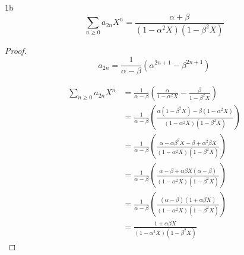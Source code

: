 \documentclass{article}
\begin{document}
\begin{claim}{1b}\label{Claim 1b.}
    \[
        \sum_{n \geq 0}a_{2n} X^n = \frac{\alpha + \beta}{(1 - \alpha^2 X)(1 - \beta^2 X)}
    \]
\end{claim}
\begin{proof}
    \[a_{2n} = \frac{1}{\alpha - \beta}(\alpha^{2n + 1} - \beta^{2n + 1})\]

    \begin{align*}
        \sum_{n \geq 0} a_{2n} X^n &= \frac{1}{\alpha - \beta}\left(\frac{\alpha}{1 - \alpha^2X} - \frac{\beta}{1 - \beta^2X}\right) \\
        &= \frac{1}{\alpha - \beta}\left(\frac{\alpha(1 - \beta^2X) - \beta(1 - \alpha^2 X)}{(1 - \alpha^2X)(1 - \beta^2X)}\right) \\
        &= \frac{1}{\alpha - \beta}\left(\frac{\alpha - \alpha\beta^2X - \beta + \alpha^2 \beta X}{(1 - \alpha^2X)(1 - \beta^2X)}\right) \\
        &= \frac{1}{\alpha - \beta}\left(\frac{\alpha - \beta + \alpha\beta X(\alpha - \beta)}{(1 - \alpha^2X)(1 - \beta^2X)}\right) \\
        &= \frac{1}{\alpha - \beta}\left(\frac{(\alpha - \beta)(1 + \alpha \beta X)}{(1 - \alpha^2 X)(1 - \beta^2 X)}\right) \\
        &=\frac{1 + \alpha  \beta X}{(1 - \alpha^2 X)(1 - \beta^2 X)}
    \end{align*}
\end{proof}
\end{document}
